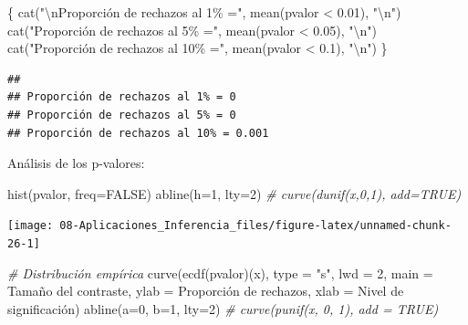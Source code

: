 \documentclass[
]{book}
\newenvironment{Shaded}{\begin{snugshade}}{\end{snugshade}}
\newcommand{\AttributeTok}[1]{\textcolor[rgb]{0.77,0.63,0.00}{#1}}
\newcommand{\CommentTok}[1]{\textcolor[rgb]{0.56,0.35,0.01}{\textit{#1}}}
\newcommand{\ConstantTok}[1]{\textcolor[rgb]{0.00,0.00,0.00}{#1}}
\newcommand{\DecValTok}[1]{\textcolor[rgb]{0.00,0.00,0.81}{#1}}
\newcommand{\FloatTok}[1]{\textcolor[rgb]{0.00,0.00,0.81}{#1}}
\newcommand{\FunctionTok}[1]{\textcolor[rgb]{0.00,0.00,0.00}{#1}}
\newcommand{\NormalTok}[1]{#1}
\newcommand{\SpecialCharTok}[1]{\textcolor[rgb]{0.00,0.00,0.00}{#1}}
\newcommand{\StringTok}[1]{\textcolor[rgb]{0.31,0.60,0.02}{#1}}
\theoremstyle{break}
\theoremstyle{definition}
\theoremstyle{definition}
\theoremstyle{definition}
\theoremstyle{definition}
\theoremstyle{remark}
\begin{document}
\begin{enumerate}
\begin{Shaded}
\begin{Highlighting}[]
\NormalTok{\{}
  \FunctionTok{cat}\NormalTok{(}\StringTok{"}\SpecialCharTok{\textbackslash{}n}\StringTok{Proporción de rechazos al 1\% ="}\NormalTok{, }\FunctionTok{mean}\NormalTok{(pvalor }\SpecialCharTok{\textless{}} \FloatTok{0.01}\NormalTok{), }\StringTok{"}\SpecialCharTok{\textbackslash{}n}\StringTok{"}\NormalTok{)}
  \FunctionTok{cat}\NormalTok{(}\StringTok{"Proporción de rechazos al 5\% ="}\NormalTok{, }\FunctionTok{mean}\NormalTok{(pvalor }\SpecialCharTok{\textless{}} \FloatTok{0.05}\NormalTok{), }\StringTok{"}\SpecialCharTok{\textbackslash{}n}\StringTok{"}\NormalTok{)}
  \FunctionTok{cat}\NormalTok{(}\StringTok{"Proporción de rechazos al 10\% ="}\NormalTok{, }\FunctionTok{mean}\NormalTok{(pvalor }\SpecialCharTok{\textless{}} \FloatTok{0.1}\NormalTok{), }\StringTok{"}\SpecialCharTok{\textbackslash{}n}\StringTok{"}\NormalTok{)}
\NormalTok{\}}
\end{Highlighting}
\end{Shaded}

\begin{verbatim}
## 
## Proporción de rechazos al 1% = 0 
## Proporción de rechazos al 5% = 0 
## Proporción de rechazos al 10% = 0.001
\end{verbatim}

  Análisis de los p-valores:

\begin{Shaded}
\begin{Highlighting}[]
\FunctionTok{hist}\NormalTok{(pvalor, }\AttributeTok{freq=}\ConstantTok{FALSE}\NormalTok{)}
\FunctionTok{abline}\NormalTok{(}\AttributeTok{h=}\DecValTok{1}\NormalTok{, }\AttributeTok{lty=}\DecValTok{2}\NormalTok{)   }\CommentTok{\# curve(dunif(x,0,1), add=TRUE)}
\end{Highlighting}
\end{Shaded}

  \begin{center}\texttt{[image: 08-Aplicaciones\_Inferencia\_files/figure-latex/unnamed-chunk-26-1]} \end{center}

\begin{Shaded}
\begin{Highlighting}[]
\CommentTok{\# Distribución empírica}
\FunctionTok{curve}\NormalTok{(}\FunctionTok{ecdf}\NormalTok{(pvalor)(x), }\AttributeTok{type =} \StringTok{"s"}\NormalTok{, }\AttributeTok{lwd =} \DecValTok{2}\NormalTok{, }
      \AttributeTok{main =} \StringTok{\textquotesingle{}Tamaño del contraste\textquotesingle{}}\NormalTok{, }\AttributeTok{ylab =} \StringTok{\textquotesingle{}Proporción de rechazos\textquotesingle{}}\NormalTok{, }
      \AttributeTok{xlab =} \StringTok{\textquotesingle{}Nivel de significación\textquotesingle{}}\NormalTok{)}
\FunctionTok{abline}\NormalTok{(}\AttributeTok{a=}\DecValTok{0}\NormalTok{, }\AttributeTok{b=}\DecValTok{1}\NormalTok{, }\AttributeTok{lty=}\DecValTok{2}\NormalTok{)   }\CommentTok{\# curve(punif(x, 0, 1), add = TRUE)}
\end{Highlighting}
\end{Shaded}


\end{enumerate}
\end{document}
